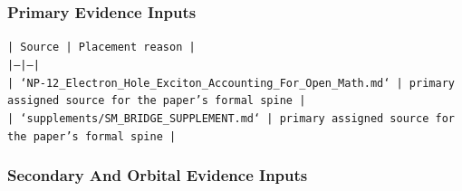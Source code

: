 \documentclass[11pt]{article}
\begin{document}
\subsubsection*{Primary Evidence Inputs}

\noindent\texttt{| Source | Placement reason |}\\
\noindent\texttt{|---|---|}\\
\noindent\texttt{| `NP-12\_Electron\_Hole\_Exciton\_Accounting\_For\_Open\_Math.md` | primary assigned source for the paper's formal spine |}\\
\noindent\texttt{| `supplements/SM\_BRIDGE\_SUPPLEMENT.md` | primary assigned source for the paper's formal spine |}\\

\subsubsection*{Secondary And Orbital Evidence Inputs}
\end{document}
